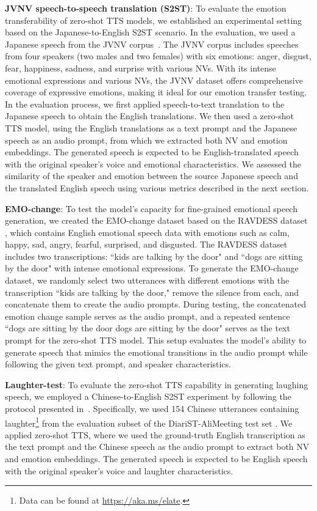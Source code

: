 \textbf{JVNV speech-to-speech translation (S2ST)}: To evaluate the emotion transferability of zero-shot TTS models, we established an experimental setting based on the Japanese-to-English S2ST scenario. In the evaluation, we used a Japanese speech from the JVNV corpus~\cite{xin2024jvnv}.
The JVNV corpus includes 
speeches from four speakers (two males and two females) with 
six emotions: anger, disgust, fear, happiness, sadness, and surprise with various NVs.
With its intense emotional expressions and various NVs, the JVNV dataset offers comprehensive coverage of expressive emotions, making it ideal for our emotion transfer testing. 
In the evaluation process,
we first applied speech-to-text translation to the Japanese speech to obtain the English translations. We then used a zero-shot TTS model, using the English translations as a text prompt and the Japanese speech as an audio prompt, from which we extracted both NV and emotion embeddings. The generated speech is expected to be English-translated speech with the original speaker's voice and emotional characteristics.
We assessed the similarity of the speaker and emotion between the source Japanese speech and the translated English speech using various metrics described in the next section.

\textbf{EMO-change}: To test the model's capacity for fine-grained emotional speech generation, we created the EMO-change dataset based on the RAVDESS dataset \cite{livingstone2018ryerson}, which contains English emotional speech data with emotions such as calm, happy, sad, angry, fearful, surprised, and disgusted. The RAVDESS dataset includes two transcriptions: ``kids are talking by the door" and ``dogs are sitting by the door" with intense emotional expressions. 
To generate the EMO-change dataset, we randomly select two utterances with different emotions with the transcription ``kids are talking by the door," remove the silence from each, and concatenate them to create the audio prompts. During testing, the concatenated emotion change sample serves as the audio prompt, and a repeated sentence ``dogs are sitting by the door dogs are sitting by the door" serves as the text prompt for the zero-shot TTS model. This setup evaluates the model's ability to generate speech that mimics the emotional transitions in the audio prompt while following the given text prompt, and speaker characteristics.

\textbf{Laughter-test}: To evaluate the zero-shot TTS capability in generating laughing speech, we employed a Chinese-to-English S2ST experiment
by following the protocol presented in~\cite{kanda2024making}.
Specifically, 
we used 154 Chinese utterances containing laughter\footnote{Data can be found at \url{https://aka.ms/elate}.}
from the evaluation subset of the DiariST-AliMeeting test set \cite{yang2024diarist}.
We applied zero-shot TTS, where
we used the ground-truth English transcription as the text prompt and 
the Chinese speech as the audio prompt to extract both 
NV and emotion embeddings. 
The generated speech is expected to be English speech with the original speaker's voice and laughter characteristics.

